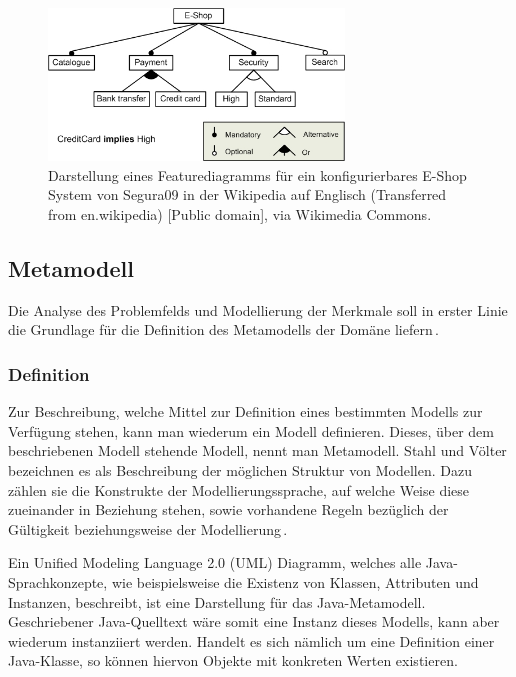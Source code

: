 \documentclass[12pt,oneside,a4paper,parskip]{scrbook}
\begin{document}
\begin{figure}[tbp]
\centering
\includegraphics[width=0.7\textwidth]{bilder/E-shopFM.jpg}
\caption{Darstellung eines Featurediagramms für ein konfigurierbares E-Shop System von Segura09 in der Wikipedia auf Englisch (Transferred from en.wikipedia) [Public domain], via Wikimedia Commons.}
\label{fig:fd}
\end{figure}

\subsection{Metamodell}

Die Analyse des Problemfelds und Modellierung der Merkmale soll in erster Linie die Grundlage für die Definition des Metamodells der Domäne liefern\,\cite[S. 200]{stahl2007}.

\subsubsection{Definition}

Zur Beschreibung, welche Mittel zur Definition eines bestimmten Modells zur Verfügung stehen, kann man wiederum ein Modell definieren. Dieses, über dem beschriebenen Modell stehende Modell, nennt man Metamodell. Stahl und Völter bezeichnen es als Beschreibung der möglichen Struktur von Modellen. Dazu zählen sie die Konstrukte der Modellierungssprache, auf welche Weise diese zueinander in Beziehung stehen, sowie vorhandene Regeln bezüglich der Gültigkeit beziehungsweise der Modellierung\,\cite[S. 59]{stahl2007}.

Ein Unified Modeling Language 2.0 (UML) Diagramm, welches alle Java-Sprachkonzepte, wie beispielsweise die Existenz von Klassen, Attributen und Instanzen, beschreibt, ist eine Darstellung für das Java-Metamodell. Geschriebener Java-Quelltext wäre somit eine Instanz dieses Modells, kann aber wiederum instanziiert werden. Handelt es sich nämlich um eine Definition einer Java-Klasse, so können hiervon Objekte mit konkreten Werten existieren.
\end{document}
